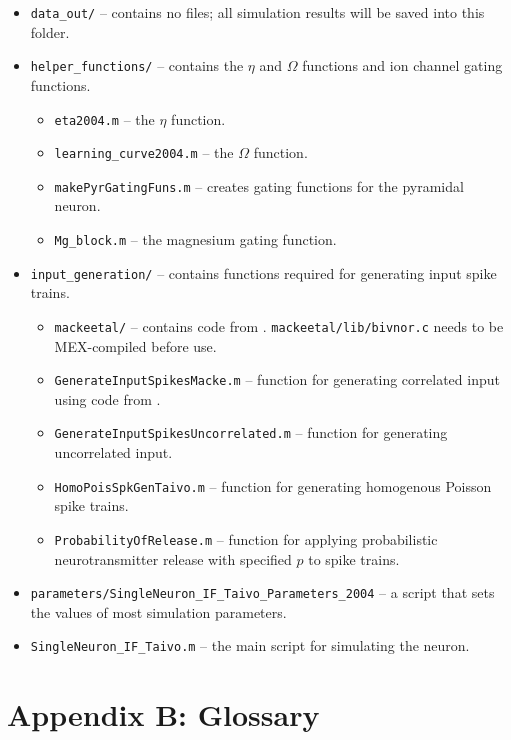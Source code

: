 \documentclass[a4paper,12pt]{report}
\theoremstyle{definition}
\begin{document}
\begin{itemize}
    \item \verb+data_out/+ -- contains no files; all simulation results will be saved into this folder.
  \item \verb+helper_functions/+ -- contains the $\eta$ and $\Omega$ functions and ion channel gating functions.
  \begin{itemize}
    \item \verb+eta2004.m+ -- the $\eta$ function.
    \item \verb+learning_curve2004.m+ -- the $\Omega$ function.
    \item \verb+makePyrGatingFuns.m+ -- creates gating functions for the pyramidal neuron.
    \item \verb+Mg_block.m+ -- the magnesium gating function.
  \end{itemize}
  \item \verb+input_generation/+ -- contains functions required for generating input spike trains.
  \begin{itemize}
    \item \verb+mackeetal/+ -- contains code from \cite{macke2009}. \verb+mackeetal/lib/bivnor.c+ needs to be MEX-compiled before use.
    \item \verb+GenerateInputSpikesMacke.m+ -- function for generating correlated input using code from \cite{macke2009}.
    \item \verb+GenerateInputSpikesUncorrelated.m+ -- function for generating uncorrelated input.
    \item \verb+HomoPoisSpkGenTaivo.m+ -- function for generating homogenous Poisson spike trains.
    \item \verb+ProbabilityOfRelease.m+ -- function for applying probabilistic neurotransmitter release with specified $p$ to spike trains.
  \end{itemize}
  \item \verb+parameters/SingleNeuron_IF_Taivo_Parameters_2004+ -- a script that sets the values of most simulation parameters.
  \item \verb+SingleNeuron_IF_Taivo.m+ -- the main script for simulating the neuron.
\end{itemize}









\chapter*{Appendix B: Glossary}
\label{appendix:glossary}
\end{document}
